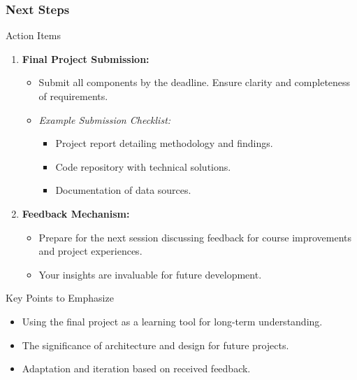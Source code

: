 \documentclass[aspectratio=169]{beamer}
\begin{document}
\begin{frame}[fragile]
    \frametitle{Next Steps}
    \begin{block}{Action Items}
        \begin{enumerate}
            \item \textbf{Final Project Submission:}
                \begin{itemize}
                    \item Submit all components by the deadline. Ensure clarity and completeness of requirements.
                    \item \textit{Example Submission Checklist:}
                        \begin{itemize}
                            \item Project report detailing methodology and findings.
                            \item Code repository with technical solutions.
                            \item Documentation of data sources.
                        \end{itemize}
                \end{itemize}

            \item \textbf{Feedback Mechanism:}
                \begin{itemize}
                    \item Prepare for the next session discussing feedback for course improvements and project experiences.
                    \item Your insights are invaluable for future development.
                \end{itemize}
        \end{enumerate}
    \end{block}

    \begin{block}{Key Points to Emphasize}
        \begin{itemize}
            \item Using the final project as a learning tool for long-term understanding.
            \item The significance of architecture and design for future projects.
            \item Adaptation and iteration based on received feedback.
        \end{itemize}
    \end{block}
\end{frame}
\end{document}
